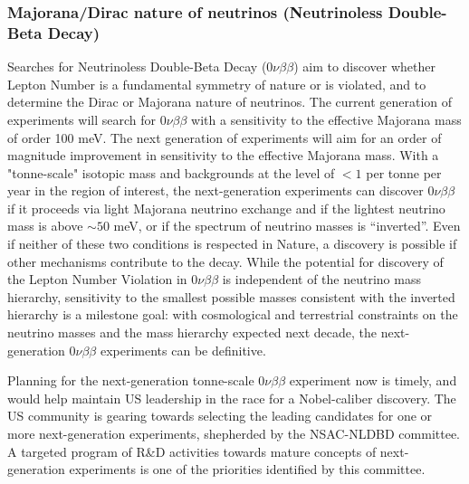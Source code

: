 \subsubsection{Majorana/Dirac nature of neutrinos (Neutrinoless
  Double-Beta Decay)}

Searches for Neutrinoless Double-Beta Decay
($0\nu\beta\beta$) aim to discover whether Lepton Number is a
fundamental symmetry of nature or is violated, and to determine the Dirac or
Majorana nature of neutrinos. The current generation of experiments
will search for $0\nu\beta\beta$  with a sensitivity to the effective Majorana
mass of order 100 meV. The next generation of experiments will aim for
an order of magnitude improvement in sensitivity to the effective
Majorana mass. With a "tonne-scale" isotopic mass and backgrounds at
the level of $<1$ per tonne per year in the region of interest, the
next-generation experiments  can  discover
$0\nu\beta\beta$ if it proceeds via light Majorana neutrino exchange
and if the lightest neutrino 
mass is above $\sim50$ meV, or if the spectrum of neutrino masses is
``inverted''. Even if neither of these two conditions is respected in
Nature, a discovery is possible if other mechanisms contribute to the
decay. While the potential for discovery of the Lepton Number
Violation in $0\nu\beta\beta$ is independent of the neutrino mass
hierarchy, sensitivity to the smallest possible masses consistent with
the inverted hierarchy is a milestone goal: with cosmological and
terrestrial constraints on the neutrino masses and the mass hierarchy
expected next decade, the next-generation  $0\nu\beta\beta$
experiments can be definitive.  

Planning for the next-generation tonne-scale  $0\nu\beta\beta$
experiment now is timely, and would help maintain US leadership in
the race for a Nobel-caliber discovery. The US community is
gearing towards selecting the 
leading candidates for one or more next-generation experiments,
shepherded by the NSAC-NLDBD committee. 
A targeted program of R\&D
activities towards mature concepts of next-generation experiments
is one of the priorities identified by this committee. 


